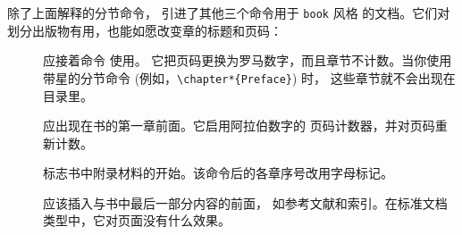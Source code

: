 除了上面解释的分节命令，\LaTeXe{} 引进了其他三个命令用于 \verb|book| 风格
的文档。它们对划分出版物有用，也能如愿改变章的标题和页码：
\begin{description}
\item[] 应接着命令 \verb|| 使用。
     它把页码更换为罗马数字，而且章节不计数。当你使用带星的分节命令 (例如，\verb|\chapter*{Preface}|) 时，
     这些章节就不会出现在目录里。
\item[] 应出现在书的第一章前面。它启用阿拉伯数字的
     页码计数器，并对页码重新计数。
\item[] 标志书中附录材料的开始。该命令后的各章序号改用字母标记。
\item[] 应该插入与书中最后一部分内容的前面，
     如参考文献和索引。在标准文档类型中，它对页面没有什么效果。
\end{description}


